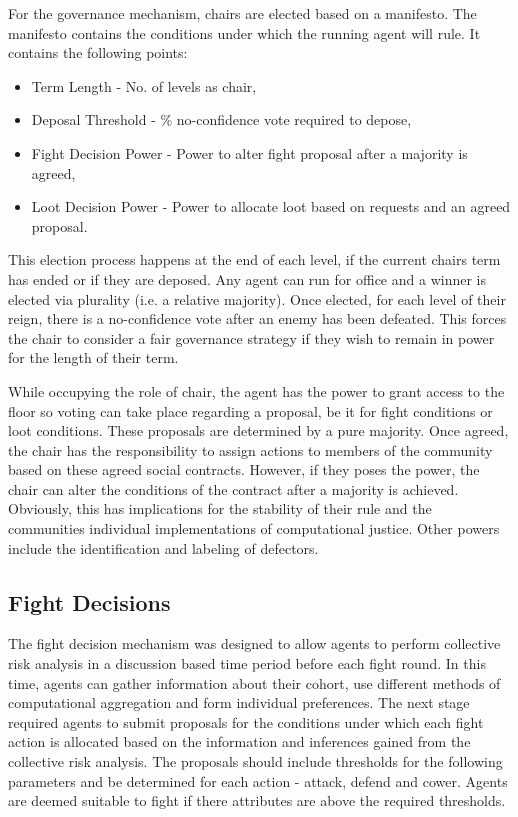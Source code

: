 For the governance mechanism, chairs are elected based on a manifesto. The manifesto contains the conditions under which the running agent will rule. It contains the following points:

\begin{itemize}
    \item Term Length - No. of levels as chair,
    \item Deposal Threshold - \% no-confidence vote required to depose,
    \item Fight Decision Power - Power to alter fight proposal after a majority is agreed,
    \item Loot Decision Power - Power to allocate loot based on requests and an agreed proposal.
\end{itemize}

This election process happens at the end of each level, if the current chairs term has ended or if they are deposed. Any agent can run for office and a winner is elected via plurality (i.e. a relative majority). Once elected, for each level of their reign, there is a no-confidence vote after an enemy has been defeated. This forces the chair to consider a fair governance strategy if they wish to remain in power for the length of their term. 

While occupying the role of chair, the agent has the power to grant access to the floor so voting can take place regarding a proposal, be it for fight conditions or loot conditions. These proposals are determined by a pure majority. Once agreed, the chair has the responsibility to assign actions to members of the community based on these agreed social contracts. However, if they poses the power, the chair can alter the conditions of the contract after a majority is achieved. Obviously, this has implications for the stability of their rule and the communities individual implementations of computational justice. Other powers include the identification and labeling of defectors. 


\subsection{Fight Decisions}\label{sec: fight decision}


The fight decision mechanism was designed to allow agents to perform collective risk analysis in a discussion based time period before each fight round. In this time, agents can gather information about their cohort, use different methods of computational aggregation and form individual preferences. The next stage required agents to submit proposals for the conditions under which each fight action is allocated based on the information and inferences gained from the collective risk analysis. The proposals should include thresholds for the following parameters and be determined for each action - attack, defend and cower. Agents are deemed suitable to fight if there attributes are above the required thresholds.  

